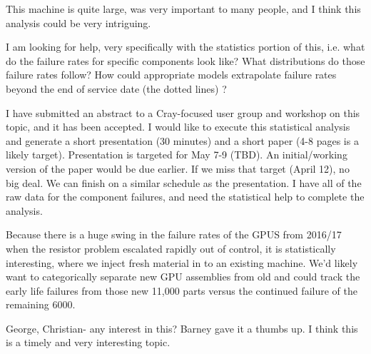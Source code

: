 This machine is quite large, was very important to many people, and I
think this analysis could be very intriguing. 
 
I am looking for help, very specifically with the statistics portion
of this, i.e. what do the failure rates for specific components look
like? What distributions do those failure rates follow? How could
appropriate models extrapolate failure rates beyond the end of service
date (the dotted lines) ? 
 
I have submitted an abstract to a Cray-focused user group and workshop
on this topic, and it has been accepted.  I would like to execute this
statistical analysis and generate a short presentation (30 minutes)
and a short paper (4-8 pages is a likely target).  Presentation is
targeted for May 7-9 (TBD). An initial/working version of the paper
would be due earlier. If we miss that target (April 12), no big
deal. We can finish on a similar schedule as the presentation.  I have
all of the raw data for the component failures, and need the
statistical help to complete the analysis. 
 
Because there is a huge swing in the failure rates of the GPUS from
2016/17 when the resistor problem escalated rapidly out of control, it
is statistically interesting, where we inject fresh material in to an
existing machine. We’d likely want to categorically separate new GPU
assemblies from old and could track the early life failures from those
new 11,000 parts versus the continued failure of the remaining 6000. 
 
George, Christian-  any interest in this? Barney gave it a thumbs
up. I think this is a timely and very interesting topic. 

